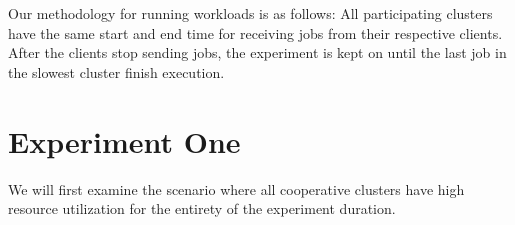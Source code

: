 Our methodology for running workloads is as follows: All participating clusters
have the same start and end time for receiving jobs from their respective
clients. After the clients stop sending jobs, the experiment is kept on until
the last job in the slowest cluster finish execution. 

\section{Experiment One}

\begin{center}
\end{center}
We will first examine the scenario where all cooperative clusters have high
resource utilization for the entirety of the experiment duration.


